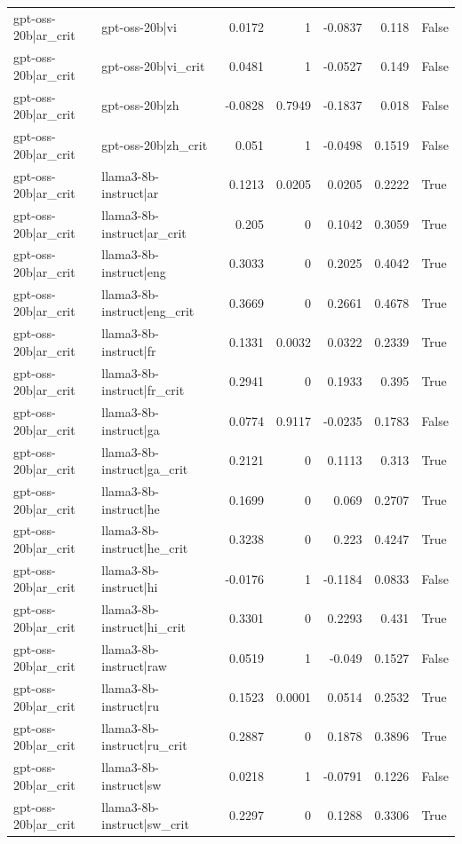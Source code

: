 \begin{table}
\begin{tabular}{l l r r r r l}
gpt-oss-20b|ar_crit & gpt-oss-20b|vi & 0.0172 & 1 & -0.0837 & 0.118 & False \\
gpt-oss-20b|ar_crit & gpt-oss-20b|vi_crit & 0.0481 & 1 & -0.0527 & 0.149 & False \\
gpt-oss-20b|ar_crit & gpt-oss-20b|zh & -0.0828 & 0.7949 & -0.1837 & 0.018 & False \\
gpt-oss-20b|ar_crit & gpt-oss-20b|zh_crit & 0.051 & 1 & -0.0498 & 0.1519 & False \\
gpt-oss-20b|ar_crit & llama3-8b-instruct|ar & 0.1213 & 0.0205 & 0.0205 & 0.2222 & True \\
gpt-oss-20b|ar_crit & llama3-8b-instruct|ar_crit & 0.205 & 0 & 0.1042 & 0.3059 & True \\
gpt-oss-20b|ar_crit & llama3-8b-instruct|eng & 0.3033 & 0 & 0.2025 & 0.4042 & True \\
gpt-oss-20b|ar_crit & llama3-8b-instruct|eng_crit & 0.3669 & 0 & 0.2661 & 0.4678 & True \\
gpt-oss-20b|ar_crit & llama3-8b-instruct|fr & 0.1331 & 0.0032 & 0.0322 & 0.2339 & True \\
gpt-oss-20b|ar_crit & llama3-8b-instruct|fr_crit & 0.2941 & 0 & 0.1933 & 0.395 & True \\
gpt-oss-20b|ar_crit & llama3-8b-instruct|ga & 0.0774 & 0.9117 & -0.0235 & 0.1783 & False \\
gpt-oss-20b|ar_crit & llama3-8b-instruct|ga_crit & 0.2121 & 0 & 0.1113 & 0.313 & True \\
gpt-oss-20b|ar_crit & llama3-8b-instruct|he & 0.1699 & 0 & 0.069 & 0.2707 & True \\
gpt-oss-20b|ar_crit & llama3-8b-instruct|he_crit & 0.3238 & 0 & 0.223 & 0.4247 & True \\
gpt-oss-20b|ar_crit & llama3-8b-instruct|hi & -0.0176 & 1 & -0.1184 & 0.0833 & False \\
gpt-oss-20b|ar_crit & llama3-8b-instruct|hi_crit & 0.3301 & 0 & 0.2293 & 0.431 & True \\
gpt-oss-20b|ar_crit & llama3-8b-instruct|raw & 0.0519 & 1 & -0.049 & 0.1527 & False \\
gpt-oss-20b|ar_crit & llama3-8b-instruct|ru & 0.1523 & 0.0001 & 0.0514 & 0.2532 & True \\
gpt-oss-20b|ar_crit & llama3-8b-instruct|ru_crit & 0.2887 & 0 & 0.1878 & 0.3896 & True \\
gpt-oss-20b|ar_crit & llama3-8b-instruct|sw & 0.0218 & 1 & -0.0791 & 0.1226 & False \\
gpt-oss-20b|ar_crit & llama3-8b-instruct|sw_crit & 0.2297 & 0 & 0.1288 & 0.3306 & True \\

\end{tabular}
\end{table}
